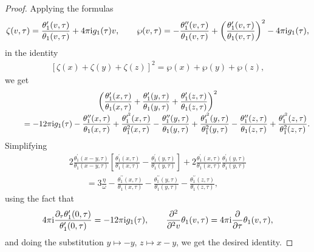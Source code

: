 \documentclass[pdftex]{sigma}%
\numberwithin{equation}{section}
\begin{document}
\begin{proof}
Applying the formulas\vspace{-.5ex}
\begin{gather*}
\zeta(v,\tau)=\frac{\theta_1^{\prime}(v,\tau)}{\theta_1(v,\tau)}+4\pi {\rm i}g_1(\tau)v,\qquad
\wp(v,\tau)=-\frac{\theta_1^{\prime\prime}(v,\tau)}{\theta_1(v,\tau)} +{\left(\frac{\theta_1^{\prime}(v,\tau)}{\theta_1(v,\tau)}\right)}^2-4\pi {\rm i}g_1(\tau),
\end{gather*}
in the identity~\cite{E.T.WhittakerandG.N.Watson}\vspace{-.5ex}
\begin{gather*}
\left[\zeta(x)+\zeta(y)+\zeta(z)\right]^2=\wp(x)+\wp(y)+\wp(z),
\end{gather*}
we get
\begin{gather*}
\left(\frac{\theta_1^{\prime}(x,\tau)}{\theta_1(x,\tau)}+\frac{\theta_1^{\prime}(y,\tau)}{\theta_1(y,\tau)} +\frac{\theta_1^{\prime}(z,\tau)}{\theta_1(z,\tau)}\right)^2
\\[-.5ex] \qquad
{}=-12\pi {\rm i}g_1(\tau)-\frac{\theta_1^{\prime\prime}(x,\tau)}{\theta_1(x,\tau)} +\frac{\theta_1^{\prime^2}(x,\tau)}{\theta_1^2(x,\tau)} -\frac{\theta_1^{\prime\prime}(y,\tau)}{\theta_1(y,\tau)}
+\frac{\theta_1^{\prime^2}(y,\tau)}{\theta_1^2(y,\tau)} -\frac{\theta_1^{\prime\prime}(z,\tau)}{\theta_1(z,\tau)} +\frac{\theta_1^{\prime^2}(z,\tau)}{\theta_1^2(z,\tau)}.
\end{gather*}
Simplifying
\begin{gather*}
2\frac{\theta_1^{\prime}(x-y,\tau)}{\theta_1(x-y,\tau)} \left[\frac{\theta_1^{\prime}(x,\tau)}{\theta_1(x,\tau)} -\frac{\theta_1^{\prime}(y,\tau)}{\theta_1(y,\tau)}\right] +2\frac{\theta_1^{\prime}(x,\tau)}{\theta_1(x,\tau)} \frac{\theta_1^{\prime}(y,\tau)}{\theta_1(y,\tau)}
\\[-.5ex] \qquad
{}=3\frac{\eta}{\omega}-\frac{\theta_1^{\prime\prime}(x,\tau)}{\theta_1(x,\tau)} -\frac{\theta_1^{\prime\prime}(y,\tau)}{\theta_1(y,\tau)} -\frac{\theta_1^{\prime\prime}(z,\tau)}{\theta_1(z,\tau)},
\end{gather*}
using the fact that
\begin{gather}\label{difeqtheta}
4\pi {\rm i}\frac{\partial_{\tau}\theta_1^{\prime}(0,\tau)}{\theta_1^{\prime}(0,\tau)}=-12\pi {\rm i}g_1(\tau),
\qquad
\frac{\partial^2}{\partial^2 v}\theta_1(v,\tau)=4\pi {\rm i}\frac{\partial}{\partial \tau}\theta_1(v,\tau),
\end{gather}
and doing the substitution $y\mapsto -y$, $z\mapsto x-y$, we get the desired identity.
\end{proof}
\end{document}
